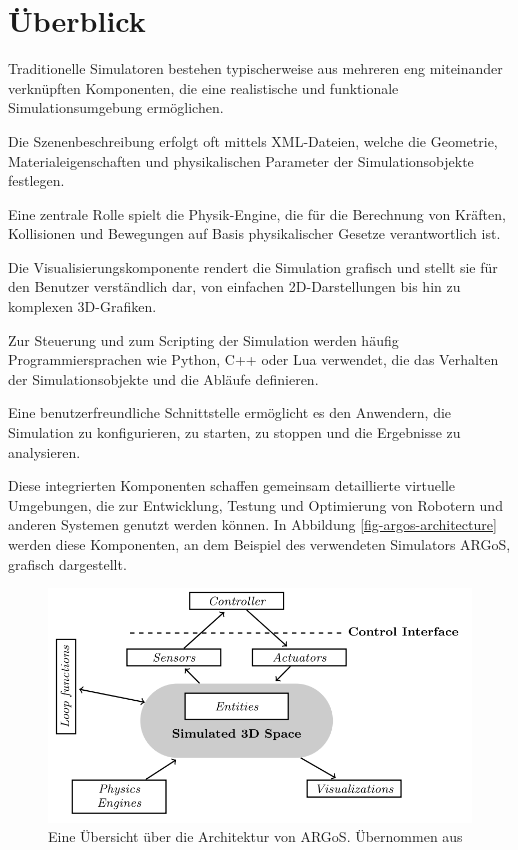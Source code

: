 \documentclass[german,version-2020-11]{uzl-thesis}
\begin{document}
\section{Überblick}
  Traditionelle Simulatoren bestehen typischerweise aus mehreren eng miteinander verknüpften Komponenten, die eine realistische und funktionale Simulationsumgebung ermöglichen. 
  
  Die Szenenbeschreibung erfolgt oft mittels XML-Dateien, welche die Geometrie, Materialeigenschaften und physikalischen Parameter der Simulationsobjekte festlegen. 
  
  Eine zentrale Rolle spielt die Physik-Engine, die für die Berechnung von Kräften, Kollisionen und Bewegungen auf Basis physikalischer Gesetze verantwortlich ist. 
  
  Die Visualisierungskomponente rendert die Simulation grafisch und stellt sie für den Benutzer verständlich dar, von einfachen 2D-Darstellungen bis hin zu komplexen 3D-Grafiken. 
  
  Zur Steuerung und zum Scripting der Simulation werden häufig Programmiersprachen wie Python, C++ oder Lua verwendet, die das Verhalten der Simulationsobjekte und die Abläufe definieren. 
  
  Eine benutzerfreundliche Schnittstelle ermöglicht es den Anwendern, die Simulation zu konfigurieren, zu starten, zu stoppen und die Ergebnisse zu analysieren. 
  
  Diese integrierten Komponenten schaffen gemeinsam detaillierte virtuelle Umgebungen, die zur Entwicklung, Testung und Optimierung von Robotern und anderen Systemen genutzt werden können.
  In Abbildung \vref{fig-argos-architecture} werden diese Komponenten, an dem Beispiel des verwendeten Simulators ARGoS, grafisch dargestellt.

  \begin{figure}[htpb]
    \centering
    \includegraphics[scale=0.9]{figures/argos_architecture.png}
    \caption{Eine Übersicht über die Architektur von ARGoS. Übernommen aus \cite{Pinciroli2012}}
    \label{fig-argos-architecture}
  \end{figure}
\end{document}

